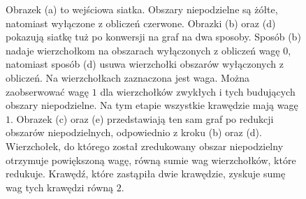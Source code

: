 \begin{figure}[h]
\begin{subfigure}{.5\textwidth}
    \caption[short]{}
\end{subfigure}
\begin{subfigure}{.5\textwidth}
    \centering
    \caption[short]{}
\end{subfigure}%
\begin{subfigure}{.5\textwidth}
    \centering
    \caption[short]{}
\end{subfigure}
\caption{Obrazek (a) to wejściowa siatka.
Obszary niepodzielne są żółte, natomiast wyłączone z obliczeń czerwone.
Obrazki (b) oraz (d) pokazują siatkę tuż po konwersji na graf na dwa sposoby.
Sposób (b) nadaje wierzchołkom na obszarach wyłączonych z obliczeń wagę $0$, natomiast sposób (d) usuwa wierzchołki obszarów
wyłączonych z obliczeń.
Na wierzchołkach zaznaczona jest waga.
Można zaobserwować wagę $1$ dla wierzchołków zwykłych i tych budujących obszary niepodzielne.
Na tym etapie wszystkie krawędzie mają wagę $1$. Obrazek (c) oraz (e) przedstawiają ten sam graf po redukcji obszarów
niepodzielnych, odpowiednio z kroku (b) oraz (d).
Wierzchołek, do którego został zredukowany obszar niepodzielny otrzymuje powiększoną wagę, równą sumie wag wierzchołków, które
redukuje. Krawędź, które zastąpiła dwie krawędzie, zyskuje sumę wag tych krawędzi równą $2$.}
\label{im:indivisible}
\end{figure}

\FloatBarrier


